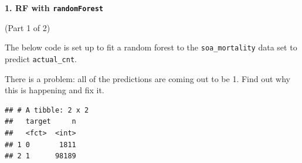 \documentclass[]{book}
\newenvironment{Shaded}{\begin{snugshade}}{\end{snugshade}}
\newcommand{\CommentTok}[1]{\textcolor[rgb]{0.56,0.35,0.01}{\textit{#1}}}
\newcommand{\DataTypeTok}[1]{\textcolor[rgb]{0.13,0.29,0.53}{#1}}
\newcommand{\DecValTok}[1]{\textcolor[rgb]{0.00,0.00,0.81}{#1}}
\newcommand{\FloatTok}[1]{\textcolor[rgb]{0.00,0.00,0.81}{#1}}
\newcommand{\KeywordTok}[1]{\textcolor[rgb]{0.13,0.29,0.53}{\textbf{#1}}}
\newcommand{\NormalTok}[1]{#1}
\newcommand{\OperatorTok}[1]{\textcolor[rgb]{0.81,0.36,0.00}{\textbf{#1}}}
\newcommand{\StringTok}[1]{\textcolor[rgb]{0.31,0.60,0.02}{#1}}
\begin{document}
\textbf{1. RF with \texttt{randomForest}}

(Part 1 of 2)

The below code is set up to fit a random forest to the \texttt{soa\_mortality} data set to predict \texttt{actual\_cnt}.

There is a problem: all of the predictions are coming out to be 1. Find out why this is happening and fix it.

\begin{Shaded}
\end{Shaded}

\begin{verbatim}
## # A tibble: 2 x 2
##   target     n
##   <fct>  <int>
## 1 0       1811
## 2 1      98189
\end{verbatim}
\end{document}
